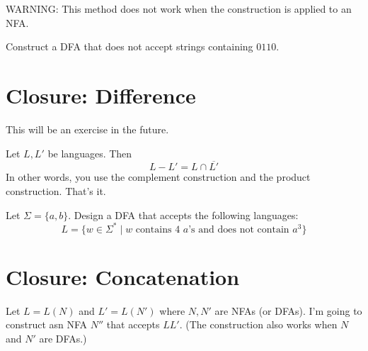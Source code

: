 WARNING: This method does not work when the construction is applied to an
NFA.

\begin{ex}
Construct a DFA that does not accept strings containing $0110$.
\end{ex}




\newpage
\section{Closure: Difference}

This will be an exercise in the future.

Let $L, L'$ be languages.
Then
\[
L - L' = L \cap \overline{L'}
\]
In other words, you use the complement construction and the product construction.
That's it.

\begin{ex}
Let $\Sigma = \{a, b\}$.
Design a DFA that accepts the following languages:
\[
L = \{w \in \Sigma^* \mid w \text{ contains 4 $a$'s and does not contain $a^3$}\}
\]
\end{ex}




\newpage
\section{Closure: Concatenation}

Let $L = L(N)$ and $L' = L(N')$ where $N, N'$ are NFAs (or DFAs).
I'm going to construct asn NFA $N''$ that accepts $LL'$.
(The construction also works when $N$ and $N'$ are DFAs.)

